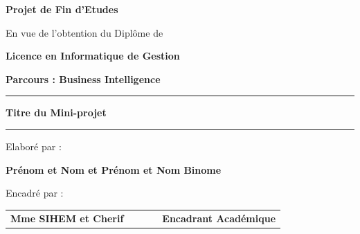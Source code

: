 \documentclass[a4paper, oneside, 12pt, final]{extreport}
\begin{document}
\begin{center}
    {\Huge\bfseries Projet de Fin d'Etudes \par}
    \vspace{0.5cm} %

    {\large En vue de l'obtention du Diplôme de \par}
    \vspace{0.5cm} %

    {\LARGE\bfseries Licence en Informatique de Gestion \par}
    \vspace{0.5cm} %

    {\LARGE\bfseries Parcours : Business Intelligence \par}
    \vspace{1.5cm} %

    \rule{\linewidth}{3pt} %
    \vspace{0.5cm} %

    {\Huge\bfseries Titre du Mini-projet \par} %
    \vspace{1cm} %

    \rule{\linewidth}{3pt} %
    \vspace{0.5cm} %

    {\Large Elaboré par : \par}
    \vspace{0.5cm} %
    {\LARGE\bfseries Prénom et Nom    et       Prénom et Nom Binome \par} %
    \vspace{1cm} %

    {\Large Encadré par : \par}
    \vspace{0.5cm} %
\end{center}
\begin{center}
\begin{tabular}{ l l l l l }
\large\bfseries Mme SIHEM et Cherif & & & & \large\bfseries Encadrant Académique \\
  
\end{tabular}
\end{center}
\end{document}
